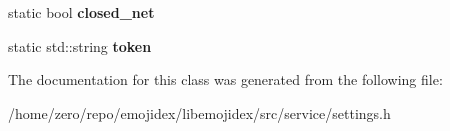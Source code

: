\begin{DoxyCompactItemize}
\item 
static bool {\bfseries closed\+\_\+net}\hypertarget{classEmojidex_1_1Service_1_1Settings_a4794a14aa2dda9d5e238c4b4c289e77c}{}\label{classEmojidex_1_1Service_1_1Settings_a4794a14aa2dda9d5e238c4b4c289e77c}

\item 
static std\+::string {\bfseries token}\hypertarget{classEmojidex_1_1Service_1_1Settings_a1aa303c664a4b238dd72c92e9660f3c4}{}\label{classEmojidex_1_1Service_1_1Settings_a1aa303c664a4b238dd72c92e9660f3c4}

\end{DoxyCompactItemize}


The documentation for this class was generated from the following file\+:\begin{DoxyCompactItemize}
\item 
/home/zero/repo/emojidex/libemojidex/src/service/settings.\+h\end{DoxyCompactItemize}
